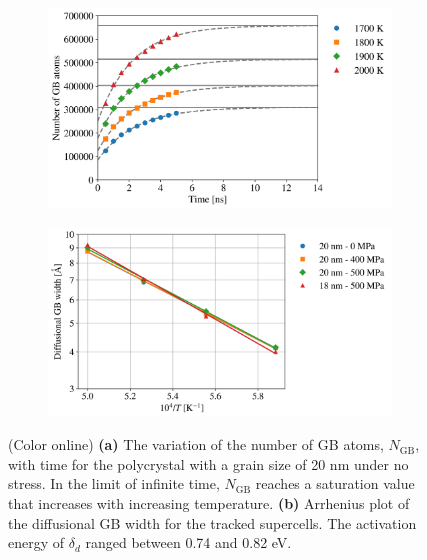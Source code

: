 \documentclass[preprint,12pt,sort&compress]{elsarticle}
\newcommand{\?}{\stackrel{?}{=}}
\begin{document}
\begin{figure}[h!]
\centering
\begin{subfigure}{0.48\textwidth}
    \includegraphics[width=\textwidth]{NGB-20-0.png}
    \caption{}
    \label{Fig:NGB}
\end{subfigure}
\hfill
\begin{subfigure}{0.48\textwidth}
    \includegraphics[width=\textwidth]{Delta.png}
    \caption{}
    \label{Fig:GBWidth}
\end{subfigure}
\caption{(Color online) \textbf{(a)} The variation of the number of GB atoms, $N_\mathrm{GB}$, with time for the polycrystal with a grain size of 20 nm under no stress. In the limit of infinite time, $N_\mathrm{GB}$ reaches a saturation value that increases with increasing temperature. \textbf{(b)} Arrhenius plot of the diffusional GB width for the tracked supercells. The activation energy of $\delta_d$ ranged between 0.74 and 0.82 eV.}
\end{figure}
\end{document}
